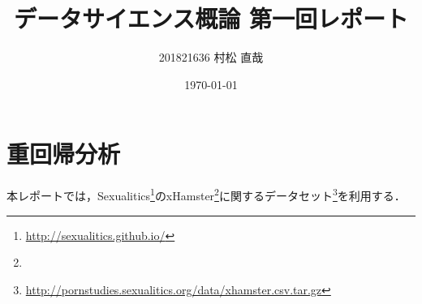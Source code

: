 \documentclass[uplatex]{jsarticle}
\begin{document}
\title{\huge データサイエンス概論 第一回レポート}
\author{201821636 村松 直哉}
\date{\today}
\maketitle

\section{重回帰分析}

本レポートでは，Sexualitics\footnote{\url{http://sexualitics.github.io/}}のxHamster\footnote{}に関するデータセット\footnote{\url{http://pornstudies.sexualitics.org/data/xhamster.csv.tar.gz}}を利用する．
\end{document}
